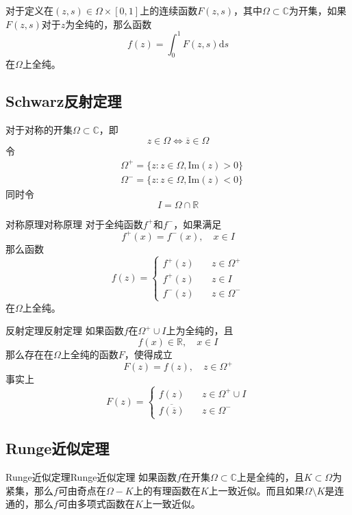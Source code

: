 \documentclass[lang = cn, scheme = chinese, thmcnt = section]{elegantbook}
\newcommand{\R}{\mathbb{R}}            %
\newcommand{\C}{\mathbb{C}}  		   %
\newcommand{\sub}{\subset}             %
\begin{document}
\begin{theorem}
	对于定义在$(z,s)\in\Omega\times[0,1]$上的连续函数$F(z,s)$，其中$\Omega\sub\C$为开集，如果$F(z,s)$对于$z$为全纯的，那么函数
	$$
	f(z)=\int_0^1{F(z,s)\mathrm{d}s}
	$$
	在$\Omega$上全纯。
\end{theorem}

\subsection{Schwarz反射定理}

对于对称的开集$\Omega\sub\C$，即
$$
z\in\Omega\iff\overline{z}\in\Omega
$$
令
\begin{align*}
	&\Omega^+=\{ z:z\in\Omega,\text{Im}(z)>0 \}\\
	&\Omega^-=\{ z:z\in\Omega,\text{Im}(z)<0 \}
\end{align*}
同时令
$$
I=\Omega\cap\R
$$

\begin{theorem}{对称原理}{对称原理}
	对于全纯函数$f^+$和$f^-$，如果满足
	$$
	f^+(x)=f^-(x),\quad x\in I
	$$
	那么函数
	$$
	f(z)=\begin{cases}
		f^+(z)\quad & z\in\Omega^+\\
		f^+(z)\quad & z\in I\\
		f^-(z)\quad & z\in\Omega^-
	\end{cases}
	$$
	在$\Omega$上全纯。
\end{theorem}

\begin{theorem}{反射定理}{反射定理}
	如果函数$f$在$\Omega^+\cup I$上为全纯的，且
	$$
	f(x)\in\R,\quad x\in I
	$$
	那么存在在$\Omega$上全纯的函数$F$，使得成立
	$$
	F(z)=f(z),\quad z\in\Omega^+
	$$
	事实上
	$$
	F(z)=\begin{cases}
		f(z)\quad & z\in\Omega^+\cup I\\
		\overline{f(\overline{z})}\quad & z\in\Omega^-
	\end{cases}
	$$
\end{theorem}

\subsection{Runge近似定理}

\begin{theorem}{Runge近似定理}{Runge近似定理}
	如果函数$f$在开集$\Omega\sub\C$上是全纯的，且$K\sub\Omega$为紧集，那么$f$可由奇点在$\Omega-K$上的有理函数在$K$上一致近似。而且如果$\Omega\setminus K$是连通的，那么$f$可由多项式函数在$K$上一致近似。
\end{theorem}
\end{document}

